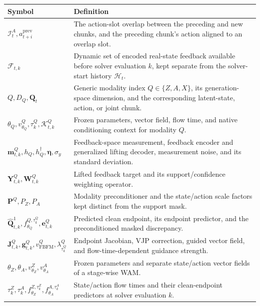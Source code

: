 \begin{table}[H]
    \centering
    \small
    \renewcommand{\arraystretch}{1.12}
    \begin{tabular}{p{} p{}}
        \hline
        \textbf{Symbol} & \textbf{Definition}\\
        \hline
        $\mathcal I_t^A,a_{t+i}^{\mathrm{prev}}$
        & The action-slot overlap between the preceding and new chunks, and the preceding chunk's action aligned to an overlap slot.\\
        $\mathcal F_{t,k}$
        & Dynamic set of encoded real-state feedback available before solver evaluation $k$, kept separate from the solver-start history $\mathcal H_t$.\\
        $Q,D_Q,\mathbf Q_t$
        & Generic modality index $Q\in\{Z,A,X\}$, its generation-space dimension, and the corresponding latent-state, action, or joint chunk.\\
        $\theta_Q,v_{\theta_Q}^Q,\tau_k^Q,\mathcal K_{t,k}^Q$
        & Frozen parameters, vector field, flow time, and native conditioning context for modality $Q$.\\
        $\mathbf m_{t,k}^Q,h_Q,h_Q^\dagger,\boldsymbol\eta,\sigma_y$
        & Feedback-space measurement, feedback encoder and generalized lifting decoder, measurement noise, and its standard deviation.\\
        $\mathbf Y_{t,k}^Q,\mathbf W_{t,k}^Q$
        & Lifted feedback target and its support/confidence weighting operator.\\
        $\mathbf P^Q,P_Z,P_A$
        & Modality preconditioner and the state/action scale factors kept distinct from the support mask.\\
        $\hat{\mathbf Q}_{t,k}^1,f_{\theta_Q}^{Q,\tau_k^Q},\mathbf e_{t,k}^Q$
        & Predicted clean endpoint, its endpoint predictor, and the preconditioned masked discrepancy.\\
        $\mathbf J_{t,k}^Q,\mathbf g_{t,k}^Q,v_{\mathrm{FBFM}}^Q,\lambda_{\tau_k^Q}^Q$
        & Endpoint Jacobian, VJP correction, guided vector field, and flow-time-dependent guidance strength.\\
        $\theta_Z,\theta_A,v_{\theta_Z}^Z,v_{\theta_A}^A$
        & Frozen parameters and separate state/action vector fields of a stage-wise WAM.\\
        $\tau_k^Z,\tau_k^A,f_{\theta_Z}^{Z,\tau_k^Z},f_{\theta_A}^{A,\tau_k^A}$
        & State/action flow times and their clean-endpoint predictors at solver evaluation $k$.\\

\end{tabular}
\end{table}
